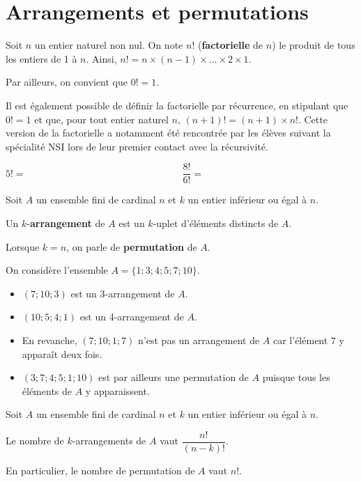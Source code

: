 \documentclass[11pt,fleqn, openany]{book} %
\begin{document}
\section{Arrangements et permutations}


\begin{definition}Soit $n$ un entier naturel non nul. On note $n!$ (\textbf{factorielle} de $n$) le produit de tous les entiers de 1 à $n$. Ainsi, $n!=n\times (n-1) \times \ldots \times 2 \times 1$.

Par ailleurs, on convient que $0!=1$.\end{definition}

Il est également possible de définir la factorielle par récurrence, en stipulant que $0!=1$ et que, pour tout entier naturel $n$, $(n+1)!=(n+1) \times n!$. Cette version de la factorielle a notamment été rencontrée par les élèves suivant la spécialité NSI lors de leur premier contact avec la récursivité.

\begin{example} $5!=\qquad\qquad\qquad\qquad\qquad\qquad\qquad\qquad \dfrac{8!}{6!}=$\end{example}

\begin{definition}Soit $A$ un ensemble fini de cardinal $n$ et $k$ un entier inférieur ou égal à $n$. 

Un $k$-\textbf{arrangement} de $A$ est un $k$-uplet d'éléments distincts de $A$.

Lorsque $k=n$, on parle de \textbf{permutation} de $A$.\end{definition}

\begin{example} On considère l'ensemble $A=\{1;3;4;5;7;10\}$. 
\begin{itemize}
\item $(7;10;3)$ est un 3-arrangement de $A$. 
\item $(10;5;4;1)$ est un 4-arrangement de $A$. 
\item En revanche, $(7;10;1;7)$ n'est pas un arrangement de $A$ car l'élément $7$ y apparaît deux fois. 
\item $(3;7;4;5;1;10)$ est par ailleurs une permutation de $A$ puisque tous les éléments de $A$ y apparaissent.
\end{itemize}
\vspace{-0.5cm}\end{example}

 
 \begin{proposition}Soit $A$ un ensemble fini de cardinal $n$ et $k$ un entier inférieur ou égal à $n$. 
 
 Le nombre de $k$-arrangements de $A$ vaut $\dfrac{n!}{(n-k)!}$.
 
 En particulier, le nombre de permutation de $A$ vaut $n!$.\end{proposition}
 
\end{document}
